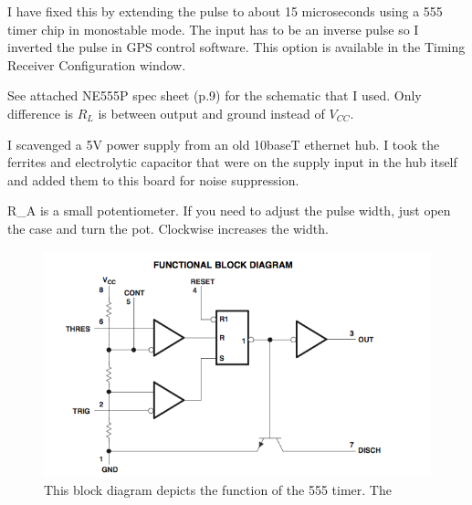I have fixed this by extending the pulse to about 15 microseconds using a 555 timer chip in monostable mode. The input has to be an inverse pulse so I inverted the pulse in GPS control software. This option is available in the Timing Receiver Configuration window.

See attached NE555P spec sheet (p.9) for the schematic that I used. Only difference is $R_L$ is between output and ground instead of $V_{CC}$.

I scavenged a 5V power supply from an old 10baseT ethernet hub. I took the ferrites and electrolytic capacitor that were on the supply input in the hub itself and added them to this board for noise suppression.

R\_A is a small potentiometer. If you need to adjust the pulse width, just open the case and turn the pot. Clockwise increases the width.

\begin{figure}[htbp]
	\centering
		\includegraphics[width=15cm]{./figures/timer555.png}
	\caption[555 Timer Diagram]{This block diagram depicts the function of the 555 timer. The }
	\label{fig:timer_diag}
\end{figure}


